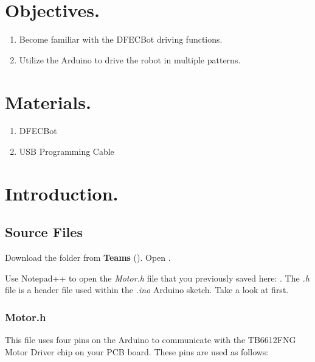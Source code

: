 \documentclass{handout}
\begin{document}
	\maketitle

	\section{Objectives.} 
	\begin{enumerate}
		\item Become familiar with the DFECBot driving functions.
		\item Utilize the Arduino to drive the robot in multiple patterns.
	\end{enumerate}
	
	\section{Materials.}
	\begin{enumerate}
		\item DFECBot
		\item USB Programming Cable
	\end{enumerate}
	
	\newpage
	\clearpage
	\pagebreak
	
	\section{Introduction.}
	
	\subsection{Source Files}
	Download the  folder from \textbf{Teams} (). Open . 
	
	
	Use Notepad++ to open the \textit{Motor.h} file that you previously saved here: . The \textit{.h} file is a header file used within the \textit{.ino}  Arduino sketch. Take a look at  first.
	
	\subsubsection{Motor.h}
	This file uses four pins on the Arduino to communicate with the TB6612FNG Motor Driver chip on your PCB board. These pins are used as follows:
	
\end{document}
